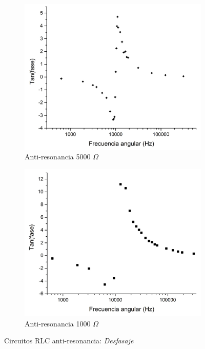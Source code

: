 \documentclass[11pt,a4paper]{article}
\begin{document}
\begin{figure}[h!]

\begin{subfigure}{0.5\textwidth}
\includegraphics[scale=0.34]{RLC_ARES_5000_Tan(fase)vsF}
  \caption{Anti-resonancia 5000 $\Omega$}
  \label{subfig:ARES_D.a}
\end{subfigure}
\begin{subfigure}{0.5\textwidth}
\includegraphics[scale=0.34]{RLC_ARES_1000_Tan(fase)vsF}
  \caption{Anti-resonancia 1000 $\Omega$}
  \label{subfig:ARES_D.b}
\end{subfigure}
  \caption{Circuitos RLC anti-resonancia: \textit{Desfasaje}}
  \label{fig:ARES_D}
\end{figure}
\end{document}
